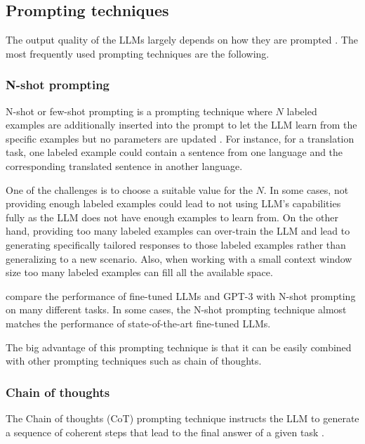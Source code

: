 \subsection{Prompting techniques}

The output quality of the LLMs largely depends on how they are prompted \cite{Brown2020,Wei2022}. The most frequently used prompting techniques are the following.


\subsubsection{N-shot prompting}

N-shot or few-shot prompting is a prompting technique where $N$ labeled examples are additionally inserted into the prompt to let the LLM learn from the specific examples but no parameters are updated \cite{Brown2020}. For instance, for a translation task, one labeled example could contain a sentence from one language and the corresponding translated sentence in another language.

One of the challenges is to choose a suitable value for the $N$. In some cases, not providing enough labeled examples could lead to not using LLM's capabilities fully as the LLM does not have enough examples to learn from. On the other hand, providing too many labeled examples can over-train the LLM and lead to generating specifically tailored responses to those labeled examples rather than generalizing to a new scenario. Also, when working with a small context window size too many labeled examples can fill all the available space.

\citet{Brown2020} compare the performance of fine-tuned LLMs and GPT-3 with N-shot prompting on many different tasks. In some cases, the N-shot prompting technique almost matches the performance of state-of-the-art fine-tuned LLMs.

The big advantage of this prompting technique is that it can be easily combined with other prompting techniques such as chain of thoughts.


\subsubsection{Chain of thoughts}
\label{sec:chain_of_thoughts}

The Chain of thoughts (CoT) prompting technique instructs the LLM to generate a sequence of coherent steps that lead to the final answer of a given task \cite{Wei2022}.


